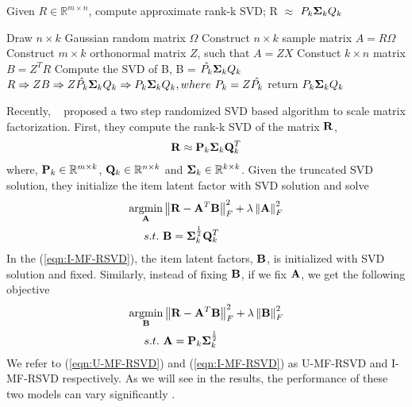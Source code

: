 
\begin{algorithm}
  	\small
	\caption{Given $R \in \mathbb{R}^{m \times n}$, compute approximate rank-k SVD; R $\approx$ $P_k \Sig_k Q_k$}
	\label{algo:RSVD}
	\begin{algorithmic}[1]

	\State Draw $n\times k$ Gaussian random matrix $\Omega$
	\State Construct $n\times k$ sample matrix $A = R\Omega$
	\State Construct $m\times k$ orthonormal matrix $Z$, such that $A  = ZX$
	\State Constuct $k\times n$ matrix $B = Z^TR$
	\State Compute the SVD of B, B =  $\hat{P_k} \Sig_k Q_k$
	\State  $R \Rightarrow ZB \Rightarrow Z \hat{P_k} \Sig_k Q_k \Rightarrow  P_k \Sig_k Q_k, where\ P_k = Z \hat{P_k}$
	\State return $P_k \Sig_k Q_k$
	\EndProcedure
	\end{algorithmic}
\end{algorithm}


Recently, ~\citep{Tang:2013} proposed a two step randomized SVD based algorithm to scale matrix factorization. First, they compute the rank-k SVD of the matrix $\R$,
\begin{align*}
	\R \approx \P_k \Sig_k \Q^T_k
\end{align*}
where, $\P_k \in \mathbb{R}^{m \times k}$, $\Q_k \in \mathbb{R}^{n \times k}$ and $\Sig_k \in \mathbb{R}^{k \times k}$. Given the truncated SVD solution, they initialize the item latent factor with SVD solution and solve 
\begin{align}
\label{eqn:I-MF-RSVD}
\underset{\A}{\mathrm{argmin}} & \left \| \R - \A^T\B\right \|_F^2 + \lambda \left \|  \A \right \|_F^2   \\
s.t.\ & \B = \Sig_k^{\frac{1}{2}} \Q^T_k 
\end{align}
In the (\ref{eqn:I-MF-RSVD}), the item latent factors, $\B$, is initialized with SVD solution and fixed. Similarly, instead of fixing $\B$, if we fix $\A$, we get the following objective 
\begin{align}
\label{eqn:U-MF-RSVD}
\underset{\B}{\mathrm{argmin}} & \left \| \R - \A^T\B\right \|_F^2 + \lambda \left \|  \B \right \|_F^2 \\
s.t.\ & \A = \P_k \Sig_k^{\frac{1}{2}}\\
\end{align}
We refer to (\ref{eqn:U-MF-RSVD}) and (\ref{eqn:I-MF-RSVD}) as U-MF-RSVD and I-MF-RSVD respectively. As we will see in the results, the performance of these two models can vary significantly .
